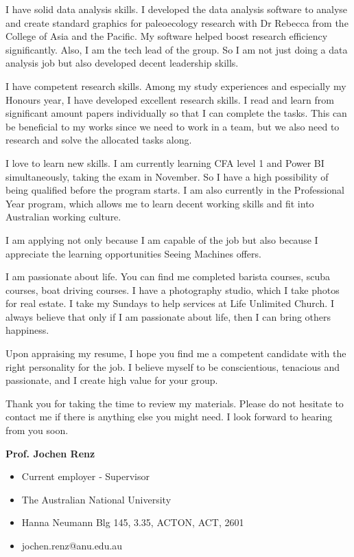 \documentclass[11pt, a4paper]{awesome-cv}
\begin{document}
\begin{cvletter}
I have solid data analysis skills. I developed the data analysis software to analyse and create standard graphics for paleoecology research with Dr Rebecca from the College of Asia and the Pacific. My software helped boost research efficiency significantly. Also, I am the tech lead of the group. So I am not just doing a data analysis job but also developed decent leadership skills.

I have competent research skills. Among my study experiences and especially my Honours year, I have developed excellent research skills. I read and learn from significant amount papers individually so that I can complete the tasks. This can be beneficial to my works since we need to work in a team, but we also need to research and solve the allocated tasks along.

I love to learn new skills. I am currently learning CFA level 1 and Power BI simultaneously, taking the exam in November. So I have a high possibility of being qualified before the program starts. I am also currently in the Professional Year program, which allows me to learn decent working skills and fit into Australian working culture.

I am applying not only because I am capable of the job but also because I appreciate the learning opportunities Seeing Machines offers.

I am passionate about life. You can find me completed barista courses, scuba courses, boat driving courses. I have a photography studio, which I take photos for real estate. I take my Sundays to help services at Life Unlimited Church. I always believe that only if I am passionate about life, then I can bring others happiness.

Upon appraising my resume, I hope you find me a competent candidate with the right personality for the job. I believe myself to be conscientious, tenacious and passionate, and I create high value for your group.

Thank you for taking the time to review my materials. Please do not hesitate to contact me if there is anything else you might need. I look forward to hearing from you soon.


\textbf{Prof. Jochen Renz}
\begin{itemize}
	\item Current employer ‑ Supervisor
	\item The Australian National University
	\item Hanna Neumann Blg 145, 3.35, ACTON, ACT, 2601
	\item jochen.renz@anu.edu.au
\end{itemize}


\end{cvletter}
\end{document}
